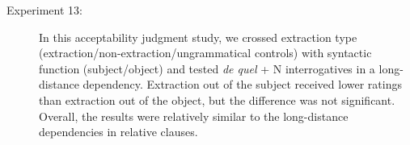 \begin{description}
\item[Experiment 13:] In this acceptability judgment study, we crossed extraction type (extraction\slash non-extraction\slash ungrammatical controls) with syntactic function (subject\slash object) and tested \emph{de quel} + N interrogatives in a long-distance dependency. Extraction out of the subject received lower ratings than extraction out of the object, but the difference was not significant. Overall, the results were relatively similar to the long-distance dependencies in relative clauses.
\end{description} 
